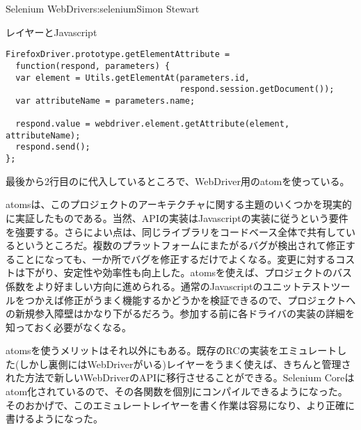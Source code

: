 \begin{aosachapter}{Selenium WebDriver}{s:selenium}{Simon Stewart}
\begin{aosasect1}{レイヤーとJavascript}
\begin{verbatim}
FirefoxDriver.prototype.getElementAttribute =
  function(respond, parameters) {
  var element = Utils.getElementAt(parameters.id,
                                   respond.session.getDocument());
  var attributeName = parameters.name;

  respond.value = webdriver.element.getAttribute(element, attributeName);
  respond.send();
};
\end{verbatim}

\noindent 最後から2行目のに代入しているところで、WebDriver用のatomを使っている。

atomsは、このプロジェクトのアーキテクチャに関する主題のいくつかを現実的に実証したものである。当然、APIの実装はJavascriptの実装に従うという要件を強要する。さらによい点は、同じライブラリをコードベース全体で共有しているというところだ。複数のプラットフォームにまたがるバグが検出されて修正することになっても、一か所でバグを修正するだけでよくなる。変更に対するコストは下がり、安定性や効率性も向上した。atomsを使えば、プロジェクトのバス係数をより好ましい方向に進められる。通常のJavascriptのユニットテストツールをつかえば修正がうまく機能するかどうかを検証できるので、プロジェクトへの新規参入障壁はかなり下がるだろう。参加する前に各ドライバの実装の詳細を知っておく必要がなくなる。

atomsを使うメリットはそれ以外にもある。既存のRCの実装をエミュレートした(しかし裏側にはWebDriverがいる)レイヤーをうまく使えば、きちんと管理された方法で新しいWebDriverのAPIに移行させることができる。Selenium Coreはatom化されているので、その各関数を個別にコンパイルできるようになった。そのおかげで、このエミュレートレイヤーを書く作業は容易になり、より正確に書けるようになった。


\end{aosasect1}
\end{aosachapter}
